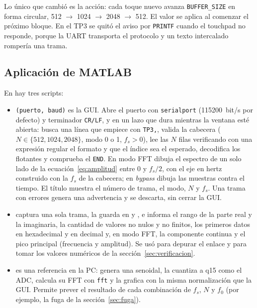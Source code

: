 \documentclass[11pt,a4paper]{article}
\begin{document}
Lo único que cambió es la acción: cada toque nuevo avanza
\texttt{BUFFER\_SIZE} en forma circular, 512 $\rightarrow$ 1024
$\rightarrow$ 2048 $\rightarrow$ 512. El valor se aplica al comenzar el
próximo bloque. En el TP3 se quitó el aviso por \texttt{PRINTF} cuando el
touchpad no responde, porque la UART transporta el protocolo y un texto
intercalado rompería una trama.

\subsection{Aplicación de MATLAB}\label{sec:matlab}

En  hay tres scripts:

\begin{itemize}
  \item {}\texttt{(puerto, baud)} es la GUI. Abre el
        puerto con \texttt{serialport} (\num{115200}~bit/s por defecto) y
        terminador \verb|CR/LF|, y en un lazo que dura mientras la ventana
        esté abierta: busca una línea que empiece con \texttt{TP3,}, valida
        la cabecera ($N \in \{512, 1024, 2048\}$, modo 0 o 1, $f_s > 0$),
        lee las $N$ filas verificando con una expresión regular el formato
        y que el índice sea el esperado, decodifica los flotantes y
        comprueba el \texttt{END}. En modo FFT dibuja el espectro de un solo
        lado de la ecuación~\eqref{eq:amplitud} entre 0 y $f_s/2$, con el eje
        en hertz construido con la $f_s$ de la cabecera; en \emph{bypass}
        dibuja las muestras contra el tiempo. El título muestra el número
        de trama, el modo, $N$ y $f_s$. Una trama con errores genera una
        advertencia y se descarta, sin cerrar la GUI.
  \item {} captura una sola trama, la guarda en
         y , e informa el rango de la parte real
        y la imaginaria, la cantidad de valores no nulos y no finitos, los
        primeros datos en hexadecimal y en decimal y, en modo FFT, la
        componente continua y el pico principal (frecuencia y amplitud). Se
        usó para depurar el enlace y para tomar los valores numéricos de la
        sección~\ref{sec:verificacion}.
  \item {} es una referencia en la PC: genera una
        senoidal, la cuantiza a q15 como el ADC, calcula su FFT con
        \texttt{fft} y la grafica con la misma normalización que la GUI.
        Permite prever el resultado de cada combinación de $f_s$, $N$ y
        $f_0$ (por ejemplo, la fuga de la sección~\ref{sec:fuga}).
\end{itemize}
\end{document}

